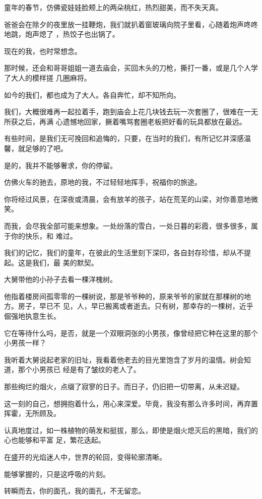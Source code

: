 \documentclass[12pt,a4paper]{article}
\begin{document}
		童年的春节，仿佛瓷娃娃脸颊上的两朵桃红，热烈甜美，而不失天真。

		爸爸会在除夕的夜里放一挂鞭炮，我们就扒着窗玻璃向院子里看，心随着炮声咚咚地跳，炮声熄了
	，热饺子也出锅了。

		现在的我，也时常想念。

		那时候，还会和哥哥姐姐一道去庙会，买回木头的刀枪，撕打一番，或是几个人学了大人的模样搓
	几圈麻将。

		如今的我们，都也成为了大人。各自奔忙，却不知所向。

		我们，大概很难再一起拉着手，跑到庙会上花几块钱去玩一次套圈了，很难在一无所获之后，再满
	心遗憾地回家，撅着嘴骂套圈老板把好看的玩具都放在最远。

		有些时间，是我们无可挽回和追悔的，只要，在当时的我们，有所记忆并深感温馨，就足够的了吧。

		是的，我并不能够奢求，你的停留。

		仿佛火车的驰去，原地的我，不过轻轻地挥手，祝福你的旅途。\par
		你将经过风景，在深夜或清晨，会有放羊的孩子，站在荒芜的山梁，对你善意地微笑。

		而我，会尽我全部可能来想象。一处纷落的雪白，一处日暮的彩霞，很多很多，属于你的快乐，和
	难过。

		我们的记忆，我们的童年，在彼此的生活里刻下深印，各自封存珍惜，却从不提起。这是我们，最
	美的默契。

		大舅带他的小孙子去看一棵洋槐树。

		他指着楼房间孤零零的一棵树说，那是爷爷种的，原来爷爷的家就在那棵树的地方。房子，早已不
	见，人，早已搬离或者逝去。只有树，那幸存的一棵树，近乎倔强地执意生长。

		它在等待什么吗，是否，就是一个双眼洞张的小男孩，像曾经把它种在这里的那个小男孩一样？

		我听着大舅说起老家的旧址，我看着他老去的目光里饱含了岁月的温情。树会知道，那个小男孩已
	经是有了皱纹的老人了。

		那些绚烂的烟火，点缀了寂寥的日子。而日子，仍旧把一切带离，从未迟疑。\par
		这一刻的自己，想拥抱着什么，用心来深爱。毕竟，我没有那么许多时间，再弃置挥霍，无所顾及。

		认真地度过，如一株植物的萌发和挺拔，那么，即使是烟火熄灭后的黑暗，我们的心也能够和平富
	足，繁花迭起。

		在盛开的光焰迷人中，世界的轮回，变得轮廓清晰。

		能够掌握的，只是这呼吸的片刻。\par
		转瞬而去，你的面孔，我的面孔，不无留恋。
\end{document}
